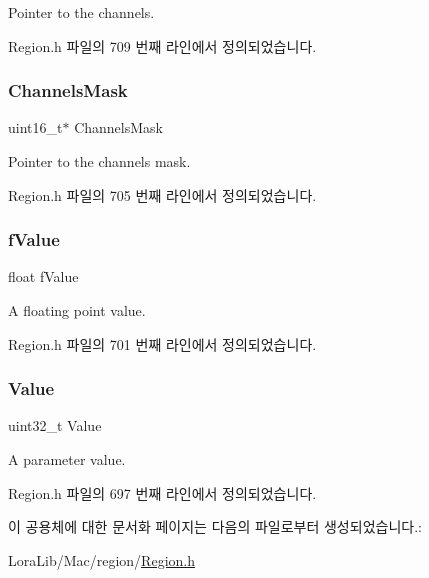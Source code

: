 Pointer to the channels. 

Region.\+h 파일의 709 번째 라인에서 정의되었습니다.

\mbox{\label{unionu_phy_param_aed7477cfc6166e3ee0499b898443426a}} 
\subsubsection{\texorpdfstring{Channels\+Mask}{ChannelsMask}}
{\footnotesize\ttfamily uint16\+\_\+t$\ast$ Channels\+Mask}

Pointer to the channels mask. 

Region.\+h 파일의 705 번째 라인에서 정의되었습니다.

\mbox{\label{unionu_phy_param_ad30735f839c3c7592fc5bc5390c45715}} 
\subsubsection{\texorpdfstring{f\+Value}{fValue}}
{\footnotesize\ttfamily float f\+Value}

A floating point value. 

Region.\+h 파일의 701 번째 라인에서 정의되었습니다.

\mbox{\label{unionu_phy_param_a8e0dcce3428a8051614e852b8836d0d1}} 
\subsubsection{\texorpdfstring{Value}{Value}}
{\footnotesize\ttfamily uint32\+\_\+t Value}

A parameter value. 

Region.\+h 파일의 697 번째 라인에서 정의되었습니다.



이 공용체에 대한 문서화 페이지는 다음의 파일로부터 생성되었습니다.\+:\begin{DoxyCompactItemize}
\item 
Lora\+Lib/\+Mac/region/\mbox{\hyperlink{_region_8h}{Region.\+h}}\end{DoxyCompactItemize}
